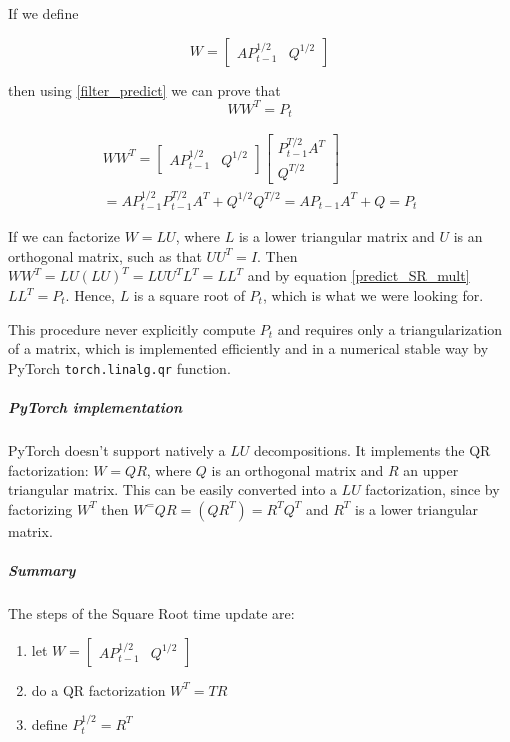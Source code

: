 \documentclass{article}
\begin{document}
If we define

\begin{equation}
    W = \begin{bmatrix}AP_{t-1}^{1/2} & Q^{1/2}\end{bmatrix}
\end{equation}

then using \ref{filter_predict} we can prove that
\begin{equation}\label{predict_SR_mult}
WW^T = P_t 
\end{equation}

\begin{multline}
  WW^T =  \begin{bmatrix}AP_{t-1}^{1/2} & Q^{1/2}\end{bmatrix}\begin{bmatrix}P_{t-1}^{T/2}A^T \\ Q^{T/2}\end{bmatrix}\\
  = AP_{t-1}^{1/2}P_{t-1}^{T/2}A^T + Q^{1/2}Q^{T/2} = AP_{t-1}A^T + Q = P_t
\end{multline}

If we  can factorize $W=LU$, where $L$ is a lower triangular matrix and $U$ is an orthogonal matrix, such as that $UU^T = I$. Then $WW^T = LU(LU)^T = LUU^TL^T = LL^T$ and by equation \ref{predict_SR_mult} $LL^T=P_t$. Hence, $L$ is a square root of $P_t$, which is what we were looking for.

This procedure never explicitly compute $P_t$ and requires only a triangularization of a matrix, which is implemented efficiently and in a numerical stable way by PyTorch \verb|torch.linalg.qr| function. 

\subparagraph{PyTorch implementation} PyTorch doesn't support natively a $LU$ decompositions. It implements the QR factorization: $W=QR$, where $Q$ is an orthogonal matrix and $R$ an upper triangular matrix. This can be easily converted into a $LU$ factorization, since by factorizing $W^T$ then $W^=QR=(QR^T)=R^TQ^T$ and $R^T$ is a lower triangular matrix.

\subparagraph{Summary} The steps of the Square Root time update are:

\begin{enumerate}
    \item let  $W = \begin{bmatrix}AP_{t-1}^{1/2} & Q^{1/2}\end{bmatrix}$
    \item do a QR factorization $W^T=TR$
    \item define $P_t^{1/2} = R^T$
\end{enumerate}
\end{document}
